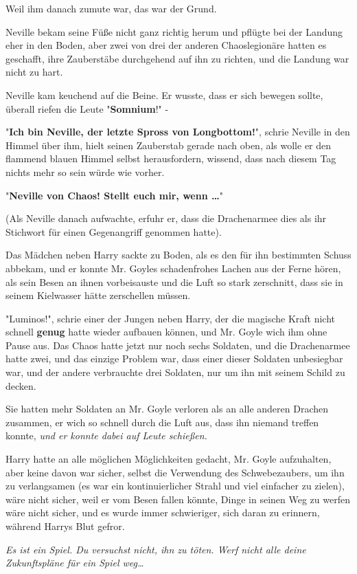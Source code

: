 {Weil ihm danach zumute war, das war der Grund.

Neville bekam seine Füße nicht ganz richtig herum und pflügte bei der Landung eher in den Boden, aber zwei von drei der anderen Chaoslegionäre hatten es geschafft, ihre Zauberstäbe durchgehend auf ihn zu richten, und die Landung war nicht zu hart.

Neville kam keuchend auf die Beine. Er wusste, dass er sich bewegen sollte, überall riefen die Leute "\textbf{Somnium}!" -

"\textbf{Ich bin Neville, der letzte Spross von Longbottom!}", schrie Neville in den Himmel über ihm, hielt seinen Zauberstab gerade nach oben, als wolle er den flammend blauen Himmel selbst herausfordern, wissend, dass nach diesem Tag nichts mehr so sein würde wie vorher.

"\textbf{Neville von Chaos! Stellt euch mir, wenn …}"

(Als Neville danach aufwachte, erfuhr er, dass die Drachenarmee dies als ihr Stichwort für einen Gegenangriff genommen hatte).

Das Mädchen neben Harry sackte zu Boden, als es den für ihn bestimmten Schuss abbekam, und er konnte Mr. Goyles schadenfrohes Lachen aus der Ferne hören, als sein Besen an ihnen vorbeisauste und die Luft so stark zerschnitt, dass sie in seinem Kielwasser hätte zerschellen müssen.

"Luminos!", schrie einer der Jungen neben Harry, der die magische Kraft nicht schnell \textbf{genug} hatte wieder aufbauen können, und Mr. Goyle wich ihm ohne Pause aus. Das Chaos hatte jetzt nur noch sechs Soldaten, und die Drachenarmee hatte zwei, und das einzige Problem war, dass einer dieser Soldaten unbesiegbar war, und der andere verbrauchte drei Soldaten, nur um ihn mit seinem Schild zu decken.

Sie hatten mehr Soldaten an Mr. Goyle verloren als an alle anderen Drachen zusammen, er wich so schnell durch die Luft aus, dass ihn niemand treffen konnte, \emph{und er konnte dabei auf Leute schießen.}

Harry hatte an alle möglichen Möglichkeiten gedacht, Mr. Goyle aufzuhalten, aber keine davon war sicher, selbst die Verwendung des Schwebezaubers, um ihn zu verlangsamen (es war ein kontinuierlicher Strahl und viel einfacher zu zielen), wäre nicht sicher, weil er vom Besen fallen könnte, Dinge in seinen Weg zu werfen wäre nicht sicher, und es wurde immer schwieriger, sich daran zu erinnern, während Harrys Blut gefror.

\emph{Es ist ein Spiel. Du versuchst nicht, ihn zu töten. Werf nicht alle deine Zukunftspläne für ein Spiel weg…}

}
